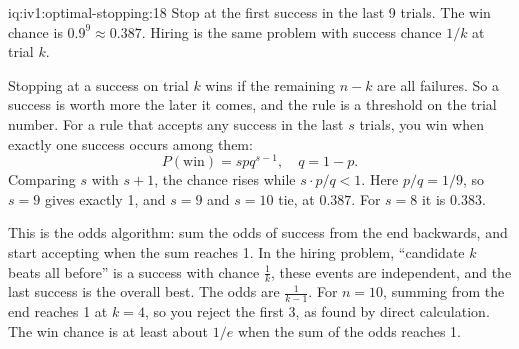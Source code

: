 \begin{solution}{iq:iv1:optimal-stopping:18}
Stop at the first success in the last 9 trials. The win chance is $0.9^9 \approx 0.387$. Hiring is the same problem with success chance $1/k$ at trial $k$.

Stopping at a success on trial $k$ wins if the remaining $n - k$ are all failures. So a success is worth more the later it comes, and the rule is a threshold on the trial number. For a rule that accepts any success in the last $s$ trials, you win when exactly one success occurs among them:
\[
P(\text{win}) = s p q^{s - 1},\quad q = 1 - p.
\]
Comparing $s$ with $s + 1$, the chance rises while $s \cdot p/q < 1$. Here $p/q = 1/9$, so $s = 9$ gives exactly 1, and $s = 9$ and $s = 10$ tie, at $0.387$. For $s = 8$ it is $0.383$.

This is the odds algorithm: sum the odds of success from the end backwards, and start accepting when the sum reaches 1. In the hiring problem, ``candidate $k$ beats all before'' is a success with chance $\frac1k$, these events are independent, and the last success is the overall best. The odds are $\frac{1}{k - 1}$. For $n = 10$, summing from the end reaches 1 at $k = 4$, so you reject the first 3, as found by direct calculation. The win chance is at least about $1/e$ when the sum of the odds reaches 1.

\end{solution}

